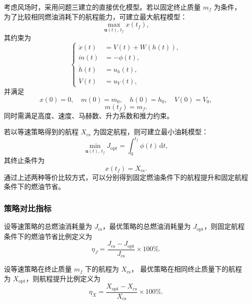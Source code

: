 \documentclass[UTF8]{ctexart}
\begin{document}
考虑风场时，采用问题三建立的直接优化模型。若以固定终止质量 $m_f$ 为条件，
为了比较相同燃油消耗下的航程能力，可建立最大航程模型：
\begin{equation}
    \max_{\boldsymbol u(t),\,t_f}
    x(t_f),
    \label{eq:q4_range_objective}
\end{equation}
其约束为
\begin{equation}
\left\{
\begin{aligned}
    \dot x(t)&=V(t)+W(h(t)),\\
    \dot m(t)&=-\phi(t),\\
    \dot h(t)&=u_h(t),\\
    \dot V(t)&=u_V(t),
\end{aligned}
\right.
\label{eq:q4_opt_state}
\end{equation}
并满足
\begin{equation}
    x(0)=0,\quad m(0)=m_0,\quad h(0)=h_0,\quad V(0)=V_0,
    \label{eq:q4_opt_initial}
\end{equation}
\begin{equation}
    m(t_f)=m_f.
    \label{eq:q4_opt_terminal_mass}
\end{equation}
同时需满足高度、速度、马赫数、升力系数和推力约束。

若以等速策略得到的航程 $X_{\mathrm{cs}}$ 为固定航程，则可建立最小油耗模型：
\begin{equation}
    \min_{\boldsymbol u(t),\,t_f}
    J_{\mathrm{opt}}
    =
    \int_0^{t_f}\phi(t)\,\mathrm{d}t,
    \label{eq:q4_fuel_objective}
\end{equation}
其终止条件为
\begin{equation}
    x(t_f)=X_{\mathrm{cs}}.
    \label{eq:q4_fixed_range}
\end{equation}
通过上述两种等价比较方式，可以分别得到固定燃油条件下的航程提升和固定航程条件下的燃油节省。

\subsubsection{策略对比指标}

设等速策略的总燃油消耗量为 $J_{\mathrm{cs}}$，最优策略的总燃油消耗量为
$J_{\mathrm{opt}}$，则固定航程条件下的燃油节省比例定义为
\begin{equation}
    \eta_J
    =
    \frac{J_{\mathrm{cs}}-J_{\mathrm{opt}}}{J_{\mathrm{cs}}}\times 100\%.
    \label{eq:q4_fuel_saving}
\end{equation}

设等速策略在终止质量 $m_f$ 下的航程为 $X_{\mathrm{cs}}$，
最优策略在相同终止质量下的航程为 $X_{\mathrm{opt}}$，则航程提升比例定义为
\begin{equation}
    \eta_X
    =
    \frac{X_{\mathrm{opt}}-X_{\mathrm{cs}}}{X_{\mathrm{cs}}}\times 100\%.
    \label{eq:q4_range_improvement}
\end{equation}
\end{document}
